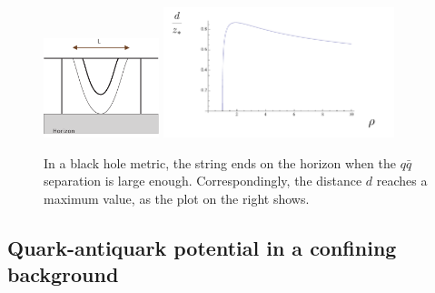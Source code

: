 \documentclass[12pt,notitlepage]{article}
\begin{document}
\begin{figure}[ht]
\center
\includegraphics[width=0.30\textwidth]{WilsonBH.pdf}
\qquad
\includegraphics[width=0.60\textwidth]{dWL_finiteT.pdf}
\caption{In a black hole metric, the string ends on the horizon when the $q\bar q$ separation is large enough. Correspondingly, the distance $d$ reaches a maximum value, as the plot on the right shows.  } 
\label{Wilson_finiteT}
\end{figure}


\subsection{Quark-antiquark potential in a confining background}
\end{document}
